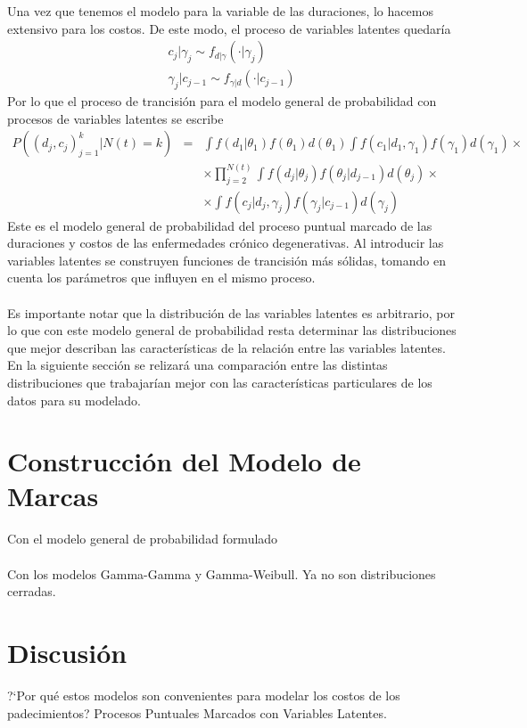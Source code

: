 Una vez que tenemos el modelo para la variable de las duraciones, lo hacemos extensivo para los costos. De este modo, el proceso de variables latentes quedar\'ia
\begin{align*}
c_{j}|\gamma_j \sim f_{d|\gamma}(\cdot|\gamma_j)\\
\gamma_j|c_{j-1} \sim f_{\gamma|d}(\cdot|c_{j-1})
\end{align*}
Por lo que el proceso de trancisi\'on para el modelo general de probabilidad con procesos de variables latentes se escribe
\begin{eqnarray}
P((d_j,c_j)_{j=1}^k|N(t)=k)&=& \int f(d_1|\theta_1)f(\theta_1)d(\theta_1) \int f(c_1|d_1,\gamma_1 ) f(\gamma_1)d(\gamma_1) \times \nonumber \\ 
&& \times \prod_{j=2}^{N(t)} \int f(d_j|\theta_j) f(\theta_j|d_{j-1}) d(\theta_j) \times \nonumber\\
&&\times \int f(c_j|d_j,\gamma_j)f(\gamma_j|c_{j-1})d(\gamma_j)  \nonumber
\end{eqnarray}
Este es el modelo general de probabilidad del proceso puntual marcado de las duraciones y costos de las enfermedades cr\'onico degenerativas. Al introducir las variables latentes se construyen funciones de trancisi\'on m\'as s\'olidas, tomando en cuenta los par\'ametros que influyen en el mismo proceso.\\
\\
Es importante notar que la distribuci\'on de las variables latentes es arbitrario, por lo que con este modelo general de probabilidad resta determinar las distribuciones que mejor describan las caracter\'isticas de la relaci\'on entre las variables latentes. En la siguiente secci\'on se relizar\'a una comparaci\'on entre las distintas distribuciones que trabajar\'ian mejor con las caracter\'isticas particulares de los datos para su modelado.\\

\section{Construcci\'on del Modelo de Marcas}
Con el modelo general de probabilidad formulado\\
\\
Con los modelos Gamma-Gamma y Gamma-Weibull. Ya no son distribuciones cerradas.
\section{Discusi\'on}
?`Por qu\'e estos modelos son convenientes para modelar los costos de los padecimientos? Procesos Puntuales Marcados con Variables Latentes.
